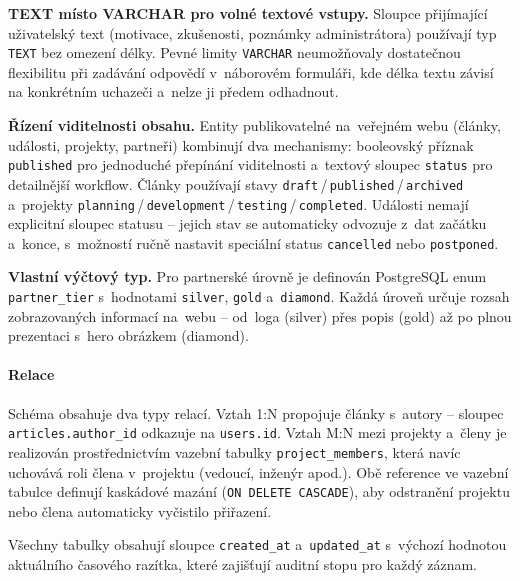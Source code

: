 \textbf{TEXT místo VARCHAR pro volné textové vstupy.} Sloupce přijímající uživatelský text (motivace, zkušenosti, poznámky administrátora) používají typ \texttt{TEXT} bez omezení délky. Pevné limity \texttt{VARCHAR} neumožňovaly dostatečnou flexibilitu při zadávání odpovědí v~náborovém formuláři, kde délka textu závisí na konkrétním uchazeči a~nelze ji předem odhadnout.

\begin{sloppypar} 
\textbf{Řízení viditelnosti obsahu.} Entity publikovatelné na~veřejném webu (články, události, projekty, partneři) kombinují dva mechanismy: booleovský příznak \texttt{published} pro jednoduché přepínání viditelnosti a~textový sloupec \texttt{status} pro detailnější workflow. Články používají stavy \texttt{draft}\,/\,\texttt{published}\,/\,\texttt{archived} a~projekty \texttt{planning}\,/\,\allowbreak\texttt{development}\,/\,\texttt{testing}\,/\,\texttt{completed}. Události nemají explicitní sloupec statusu -- jejich stav se automaticky odvozuje z~dat začátku a~konce, s~možností ručně nastavit speciální status \texttt{cancelled} nebo \texttt{pos\-tponed}.
\end{sloppypar}
\begin{sloppypar}
\textbf{Vlastní výčtový typ.} Pro partnerské úrovně je definován PostgreSQL enum \texttt{partner\-\_tier} s~hodnotami \texttt{silver}, \texttt{gold} a~\texttt{diamond}. Každá úroveň určuje rozsah zobrazovaných informací na~webu -- od~loga (silver) přes popis (gold) až po plnou prezentaci s~hero obrázkem (diamond).
\end{sloppypar}

\paragraph{Relace}

Schéma obsahuje dva typy relací. Vztah 1:N propojuje články s~autory -- sloupec \texttt{articles.author\_id} odkazuje na \texttt{users.id}. Vztah M:N mezi projekty a~členy je realizován prostřednictvím vazební tabulky \texttt{project\_members}, která navíc uchovává roli člena v~projektu (vedoucí, inženýr apod.). Obě reference ve vazební tabulce definují kaskádové mazání (\texttt{ON DELETE CASCADE}), aby odstranění projektu nebo člena automaticky vyčistilo přiřazení.

Všechny tabulky obsahují sloupce \texttt{created\_at} a~\texttt{updated\_at} s~výchozí hodnotou aktuálního časového razítka, které zajišťují auditní stopu pro každý záznam.

